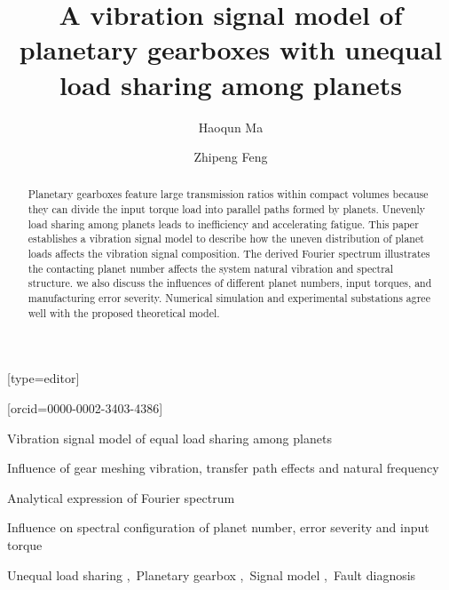 \documentclass[a4paper,fleqn]{cas-sc}%
\begin{document}
\let\WriteBookmarks\relax
\def\floatpagepagefraction{1}
\def\textpagefraction{.001}
\title[mode = title]{A vibration signal model of planetary gearboxes with unequal load sharing among planets}
\author[1]{Haoqun Ma}[type=editor]
\address[1]{University of Science and Technology Beijing, No.30, Xueyuan Road, Haidian District, Beijing.}
\author[1]{Zhipeng Feng}[orcid=0000-0002-3403-4386]
\cormark[1]
%
%
% 
\begin{abstract}
    Planetary gearboxes feature large transmission ratios within compact volumes because they can divide the input torque load into parallel paths formed by planets. Unevenly load sharing among planets leads to inefficiency and accelerating fatigue. This paper establishes a vibration signal model to describe how the uneven distribution of planet loads affects the vibration signal composition. The derived Fourier spectrum illustrates the contacting planet number affects the system natural vibration and spectral structure. we also discuss the influences of different planet numbers, input torques, and manufacturing error severity. Numerical simulation and experimental substations agree well with the proposed theoretical model.
\end{abstract}
\begin{highlights}
    \item Vibration signal model of equal load sharing among planets
    \item Influence of gear meshing vibration, transfer path effects and natural frequency
    \item Analytical expression of Fourier spectrum 
    \item Influence on spectral configuration of planet number, error severity and input torque
\end{highlights}
\begin{keywords}
    Unequal load sharing \sep\ Planetary gearbox \sep\ Signal model \sep\ Fault diagnosis
\end{keywords}
    
\maketitle
\def\degree{${}^{\circ}$}
\def\myscale{0.5}
\end{document}
